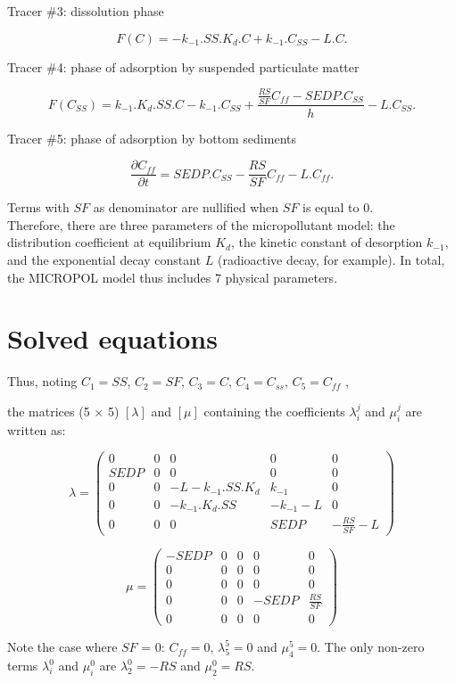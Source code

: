 Tracer $\#$3: dissolution phase

\begin{equation}
  F(C) = -k_{-1}.SS.K_d.C + k_{-1}.C_{SS} - L.C.
\end{equation}

Tracer $\#$4: phase of adsorption by suspended particulate matter

\begin{equation}
  F(C_{SS}) = k_{-1}.K_d.SS.C - k_{-1}.C_{SS} + \frac{\frac{RS}{SF}C_{ff}-SEDP.C_{SS}}{h}- L.C_{SS}.
\end{equation}

Tracer $\#$5: phase of adsorption by bottom sediments

\begin{equation}
  \frac{\partial C_{ff}}{\partial t} = SEDP.C_{SS} - \frac{RS}{SF} C_{ff} - L.C_{ff}.
\end{equation}

Terms with $SF$ as denominator are nullified when $SF$ is equal to 0.\\

Therefore, there are three parameters of the micropollutant model:
the distribution coefficient at equilibrium $K_d$,
the kinetic constant of desorption $k_{-1}$,
and the exponential decay constant $L$ (radioactive decay, for example).
In total, the MICROPOL model thus includes 7 physical parameters.

\section{Solved equations}

Thus, noting $C_1 = SS$, $C_2 = SF$, $C_3 =C$, $C_4 = C_{ss}$, $C_5 = C_{ff}$ ,

the matrices (5 $\times$ 5) $[\lambda]$ and $[\mu]$ containing the coefficients
$\lambda_i^j$ and $\mu_i^j$ are written as:

$$  \lambda = 
  \begin{pmatrix}
    0 & 0 & 0 & 0 & 0\\
    SEDP & 0 & 0 & 0 & 0\\
    0 & 0 & -L -k_{-1}.SS.K_d & k_{-1} & 0\\
    0 & 0 & -k_{-1}.K_d.SS & -k_{-1} - L & 0\\
    0 & 0 & 0 & SEDP & -\frac{RS}{SF}-L
  \end{pmatrix}
$$  

$$  \mu = 
  \begin{pmatrix}
    -SEDP & 0 & 0 & 0 & 0\\
    0 & 0 & 0 & 0 & 0\\
    0 & 0 & 0 & 0 & 0\\
    0 & 0 & 0 & -SEDP & \frac{RS}{SF}\\
    0 & 0 & 0 & 0 & 0
  \end{pmatrix}
$$  

Note the case where $SF$ = 0: $C_{ff} = 0$, $\lambda_5^5 = 0$ and $\mu_4^5 = 0$.
The only non-zero terms $\lambda_i^0$ and $\mu_i^0$ are $\lambda_2^0 = -RS$ and $\mu_2^0 = RS$.
